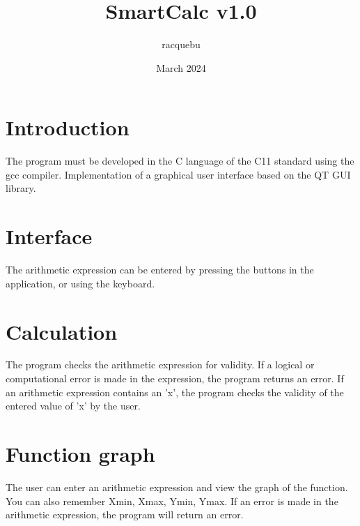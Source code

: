 \documentclass{article}
\title{SmartCalc v1.0}
\author{racquebu}
\date{March 2024}
\begin{document}
\maketitle
\section{Introduction}
The program must be developed in the C language of the C11 standard using the gcc compiler. Implementation of a graphical user interface based on the QT GUI library.
\section{Interface}
The arithmetic expression can be entered by pressing the buttons in the application, or using the keyboard.
\section{Calculation}
The program checks the arithmetic expression for validity. If a logical or computational error is made in the expression, the program returns an error.
If an arithmetic expression contains an 'x', the program checks the validity of the entered value of 'x' by the user.
\section{Function graph}
The user can enter an arithmetic expression and view the graph of the function.
You can also remember Xmin, Xmax, Ymin, Ymax.
If an error is made in the arithmetic expression, the program will return an error.
\end{document}
